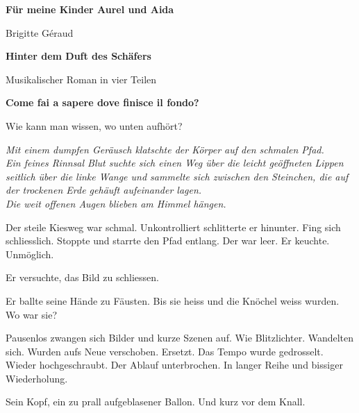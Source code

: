 \vspace*{\fill}
\begin{center}
    \textbf{Für meine Kinder Aurel und Aida}
\end{center}
\vspace*{\fill}
\vspace*{\fill}

\thispagestyle{empty}
\mbox{}
\clearpage
\thispagestyle{empty}
\mbox{}
\clearpage

\thispagestyle{empty}
\vspace*{65pt}
\begin{center}
  {\Large Brigitte Géraud}%
  \vspace{1\baselineskip}%

  {\fontsize{23}{27}\selectfont\bfseries Hinter dem Duft des Schäfers}%
  \vspace{1.25\baselineskip}%

  {\large Musikalischer Roman in vier Teilen}%
\end{center}
\vspace*{\fill}
\clearpage
\thispagestyle{empty}
\mbox{}
\clearpage

\vspace*{\fill}

\begin{center}
\textbf{Come fai a sapere dove finisce il fondo?}

Wie kann man wissen, wo unten aufhört?
\end{center}

\clearpage
\thispagestyle{empty}
\mbox{}
\clearpage

\emph{Mit einem dumpfen Geräusch klatschte der Körper auf den schmalen
Pfad.}\\
\emph{Ein feines Rinnsal Blut suchte sich einen Weg über die leicht
geöffneten Lippen seitlich über die linke Wange und sammelte sich
zwischen den Steinchen, die auf der trockenen Erde gehäuft aufeinander
lagen.}\\
\emph{Die weit offenen Augen blieben am Himmel hängen.}

\sectionbreak

Der steile Kiesweg war schmal. Unkontrolliert schlitterte er hinunter.
Fing sich schliesslich. Stoppte und starrte den Pfad entlang. Der war
leer. Er keuchte.
Unmöglich.

Er versuchte, das Bild zu schliessen.

Er ballte seine Hände zu Fäusten. Bis sie heiss und die Knöchel weiss
wurden.
Wo war sie?

\sectionbreak

Pausenlos zwangen sich Bilder und kurze Szenen auf. Wie Blitzlichter.
Wandelten sich. Wurden aufs Neue verschoben. Ersetzt. Das Tempo wurde 
gedrosselt. Wieder hochgeschraubt. Der Ablauf unterbrochen. In langer
Reihe und bissiger Wiederholung.

\sectionbreak

Sein Kopf, ein zu prall aufgeblasener Ballon. Und kurz vor dem Knall.


\clearpage
\thispagestyle{empty}
\mbox{}
\clearpage